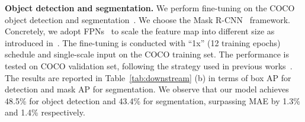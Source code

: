 \documentclass[runningheads]{llncs}
\begin{document}
\begin{table*}[t]
\centering
\caption{(a) Semantic segmentation mIoU (\%) comparison on ADE20K. (b) Object detection and instance segmentation comparison in terms of box AP () and mask AP () on COCO. The same ViT-B backbone is used.}
\label{tab:downstream}

\vspace{-2mm}
\end{table*}

\noindent \textbf{Object detection and segmentation.} 
We perform fine-tuning on the COCO object detection and segmentation~\cite{lin2014microsoftcoco}. We choose the Mask R-CNN~\cite{he2017mask} framework. Concretely, we adopt FPNs~\cite{lin2017feature} to scale the feature map into different size as introduced in~\cite{li2021benchmarking}.  The  fine-tuning  is  conducted  with  “1x”  (12  training epochs) schedule and single-scale input on the COCO training set.
The performance is tested on COCO validation set, following the strategy used in previous works~\cite{liu2021swin,dong2021cswin}. The results are reported in Table~\ref{tab:downstream} (b) in terms of box AP for detection and mask AP for segmentation. We observe that our model achieves 48.5\% for object detection and 43.4\% for segmentation, surpassing MAE by 1.3\% and 1.4\% respectively. 
\end{document}

